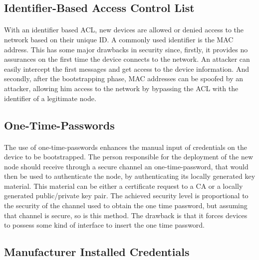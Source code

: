 \subsection{Identifier-Based Access Control List}
\paragraph{}
With an identifier based \gls{ACL}, new devices are allowed or denied access to the network based on their unique ID. A commonly used identifier is the MAC address. This has some major drawbacks in security since, firstly, it provides no assurances on the first time the device connects to the network. An attacker can easily intercept the first messages and get access to the device information. And secondly, after the bootstrapping phase, MAC addresses can be spoofed by an attacker, allowing him access to the network by bypassing the \gls{ACL} with the identifier of a legitimate node.

\subsection{One-Time-Passwords}
\paragraph{}
The use of one-time-passwords enhances the manual input of credentials on the device to be bootstrapped. The person responsible for the deployment of the new node should receive through a secure channel an one-time-password, that would then be used to authenticate the node, by authenticating its locally generated key material. This material can be either a certificate request to a \gls{CA} or a locally generated public/private key pair. The achieved security level is proportional to the security of the channel used to obtain the one time password, but assuming that channel is secure, so is this method. The drawback is that it forces devices to possess some kind of interface to insert the one time password.

\subsection{Manufacturer Installed Credentials}
